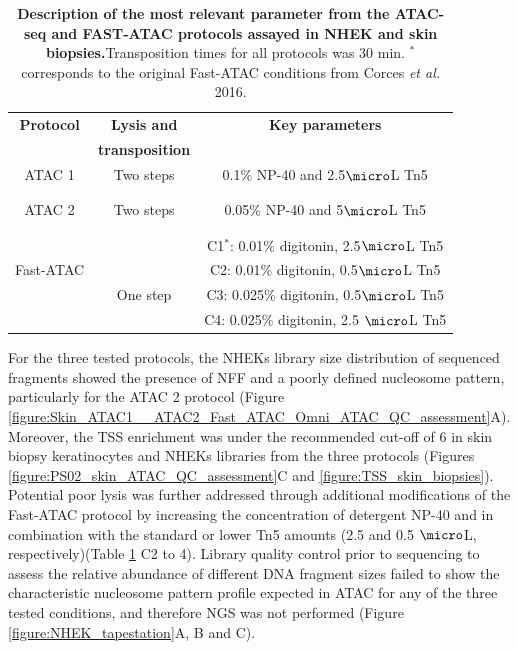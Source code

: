 \begin{table}[htbp]
\begin{tabular}{@{} c c c}
\toprule
\textbf{Protocol}   & \textbf{Lysis and} & \textbf{Key parameters} \\
                    & \textbf{transposition} &  \\
\midrule
\midrule
ATAC 1          & Two steps & 0.1\% NP-40 and 2.5$\micro$L Tn5  \\
\parencite{Buenrostro2013} && \\
&&\\
ATAC 2          &Two steps   & 0.05\% NP-40 and 5$\micro$L Tn5  \\
\parencite{Bao2015} &&\\
&&\\
                                 &             & C1$^\ast$: 0.01\% digitonin, 2.5$\micro$L Tn5 \\
 Fast-ATAC                       &             & C2: 0.01\% digitonin, 0.5$\micro$L Tn5 \\
\parencite{Corces2016}           & One step    & C3: 0.025\% digitonin, 0.5$\micro$L Tn5 \\
													       &             & C4: 0.025\% digitonin, 2.5 $\micro$L Tn5 \\
\bottomrule
\end{tabular}
\medskip %
\caption[Description of the most relevant parameter from the ATAC-seq and FAST-ATAC protocols assayed in NHEK and skin biopsies.]{\textbf{Description of the most relevant parameter from the ATAC-seq and FAST-ATAC protocols assayed in NHEK and skin biopsies.}Transposition times for all protocols was 30 min. $^\ast$ corresponds to the original Fast-ATAC conditions from Corces \textit{et al.} 2016.}
\label{tab:ATAC_skin_optimisation_protocols}
\end{table}
\bigskip %

For the three tested protocols, the NHEKs library size distribution of sequenced fragments showed the presence of NFF and a poorly defined nucleosome pattern, particularly for the ATAC 2 protocol (Figure \ref{figure:Skin_ATAC1__ATAC2_Fast_ATAC_Omni_ATAC_QC_assessment}A). Moreover, the TSS enrichment was under the recommended cut-off of 6 in skin biopsy keratinocytes and NHEKs libraries from the three protocols (Figures \ref{figure:PS02_skin_ATAC_QC_assessment}C and \ref{figure:TSS_skin_biopsies}). Potential poor lysis was further addressed through additional modifications of the Fast-ATAC protocol by increasing the concentration of detergent NP-40 and in combination with the standard or lower Tn5 amounts (2.5 and 0.5 $\micro$L, respectively)(Table \ref{tab:ATAC_skin_optimisation_protocols} C2 to 4). Library quality control prior to sequencing to assess the relative abundance of different DNA fragment sizes failed to show the characteristic nucleosome pattern profile expected in ATAC for any of the three tested conditions, and therefore NGS was not performed (Figure \ref{figure:NHEK_tapestation}A, B and C).

